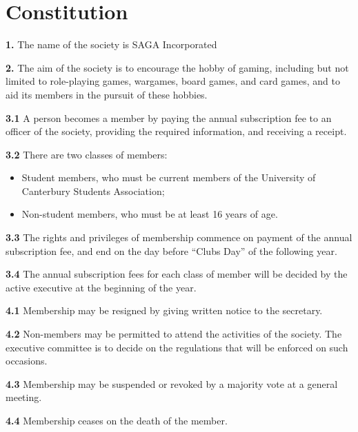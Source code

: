 \section{Constitution}


\textbf{1.} The name of the society is SAGA Incorporated

\vspace{1em}

\textbf{2.} The aim of the society is to encourage the hobby of gaming, including but not limited to role-playing games, wargames, board games, and card games, and to aid its members in the pursuit of these hobbies. 

\vspace{1em}

\textbf{3.1} A person becomes a member by paying the annual subscription fee to an officer of the society, providing the required information, and receiving a receipt.

\textbf{3.2} There are two classes of members:

\begin{itemize}
  \item Student members, who must be current members of the University of Canterbury Students Association; 
  \item Non-student members, who must be at least 16 years of age. 
\end{itemize}

\textbf{3.3} The rights and privileges of membership commence on payment of the annual subscription fee, and end on the day before ``Clubs Day'' of the following year.

\textbf{3.4} The annual subscription fees for each class of member will be decided by the active executive at the beginning of the year.

\vspace{1em}

\textbf{4.1} Membership may be resigned by giving written notice to the secretary. 

\textbf{4.2} Non-members may be permitted to attend the activities of the society. The executive committee is to decide on the regulations that will be enforced on such occasions.

\textbf{4.3} Membership may be suspended or revoked by a majority vote at a general meeting.

\textbf{4.4} Membership ceases on the death of the member.

\vspace{1em}

